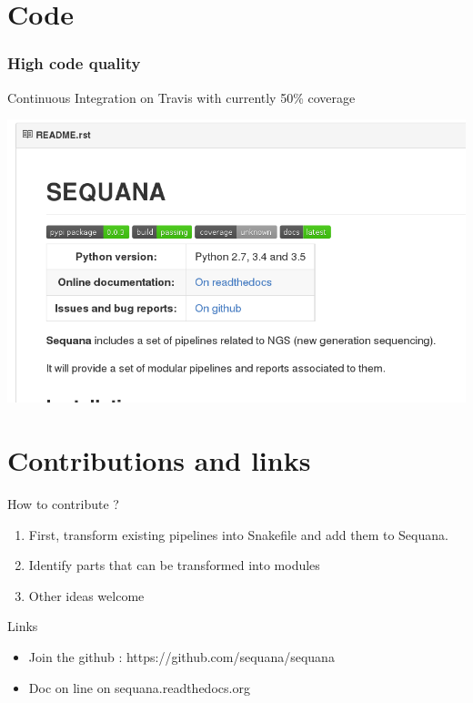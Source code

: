 \documentclass{beamer}
\begin{document}
\section{Code}

\begin{frame}[fragile]
    \frametitle{High code quality}
    \begin{block}{}
    Continuous Integration on Travis with currently 50\% coverage
    \end{block}
    
    
        \includegraphics[scale=0.35]{sequana_quality.png}
\end{frame}

\section{Contributions and links}
\begin{frame}{How to contribute ?}
\begin{enumerate}
 \item First, transform existing pipelines into Snakefile and add them to Sequana.
 \item Identify parts that can be transformed into modules
 \item Other ideas welcome
 \end{enumerate}
 
 \begin{block}{Links}
 \begin{itemize}
 \item  Join the github  : https://github.com/sequana/sequana    
 \item Doc on line on sequana.readthedocs.org
\end{itemize}
 \end{block}
\end{frame}
\end{document}
